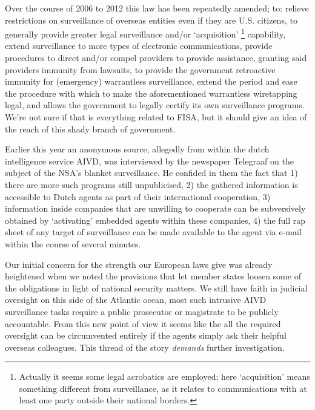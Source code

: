 \documentclass[11pt, a4paper]{article}
\begin{document}
Over the course of 2006 to 2012 this law has been repeatedly amended; to: relieve restrictions on surveillance of overseas entities even if they are U.S. citizens, to generally provide greater legal surveillance and/or `acquisition' \footnote{
Actually it seems some legal acrobatics are employed; here `acquisition' means something different from surveillance, as it relates to communications with at least one party outside their national borders.
}
capability, extend surveillance to more types of electronic communications, provide procedures to direct and/or compel providers to provide assistance, granting said providers immunity from lawsuits, to provide the government retroactive immunity for (emergency) warrantless surveillance, extend the period and ease the procedure with which to make the aforementioned warrantless wiretapping legal, and allows the government to legally certify its own surveillance programs.
We're not sure if that is everything related to FISA, but it should give an idea of the reach of this shady branch of government.

Earlier this year an anonymous source, allegedly from within the dutch intelligence service AIVD, was interviewed by the newspaper Telegraaf on the subject of the NSA's blanket surveillance. He confided in them the fact that 1) there are more such programs still unpublicised, 2) the gathered information is accessible to Dutch agents as part of their international cooperation, 3) information inside companies that are unwilling to cooperate can be subversively obtained by `activating' embedded agents within these companies, 4) the full rap sheet of any target of surveillance can be made available to the agent via e-mail within the course of several minutes.

Our initial concern for the strength our European laws give was already heightened when we noted the provisions that let member states loosen some of the obligations in light of national security matters.
We still have faith in judicial oversight on this side of the Atlantic ocean, most such intrusive AIVD surveillance tasks require a public prosecutor or magistrate to be publicly accountable.
From this new point of view it seems like the all the required oversight can be circumvented entirely if the agents simply ask their helpful overseas colleagues.
This thread of the story \textit{demands} further investigation.
\end{document}
